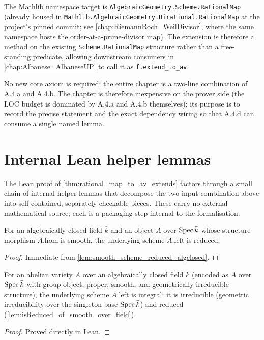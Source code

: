 The Mathlib namespace target is
\texttt{AlgebraicGeometry.Scheme.RationalMap} (already housed in
\texttt{Mathlib.AlgebraicGeometry.Birational.RationalMap} at the project's pinned commit;
see \cref{chap:RiemannRoch_WeilDivisor}, where the same namespace hosts the
order-at-a-prime-divisor map). The extension is therefore a method on the existing
\texttt{Scheme.RationalMap} structure rather than a free-standing predicate, allowing
downstream consumers in \cref{chap:Albanese_AlbaneseUP} to call it as
\texttt{f.extend\_to\_av}.

No new core axiom is required; the entire chapter is a two-line combination of A.4.a and
A.4.b. The chapter is therefore inexpensive on the prover side (the LOC budget is dominated
by A.4.a and A.4.b themselves); its purpose is to record the precise statement and the
exact dependency wiring so that A.4.d can consume a single named lemma.

\section{Internal Lean helper lemmas}
\label{sec:thm32_lean_helpers}

The Lean proof of \cref{thm:rational_map_to_av_extends} factors through a small
chain of internal helper lemmas that decompose the two-input combination above
into self-contained, separately-checkable pieces. These carry no external
mathematical source; each is a packaging step internal to the formalisation.

\begin{lemma}
  \label{lem:isReduced_of_smooth_over_field}
  For an algebraically closed field \(\bar k\) and an object \(A\) over
  \(\operatorname{Spec} \bar k\) whose structure morphism \(A.\mathrm{hom}\) is smooth, the
  underlying scheme \(A.\mathrm{left}\) is reduced.
  \begin{proof}
    Immediate from \cref{lem:smooth_scheme_reduced_algclosed}.
  \end{proof}
\end{lemma}

\begin{lemma}
  \label{lem:av_isIntegral_of_smooth_geomIrred}
  For an abelian variety \(A\) over an algebraically closed field \(\bar k\)
  (encoded as \(A\) over \(\operatorname{Spec} \bar k\) with group-object, proper, smooth, and
  geometrically irreducible structure), the underlying scheme \(A.\mathrm{left}\)
  is integral: it is irreducible (geometric irreducibility over the singleton
  base \(\operatorname{Spec} \bar k\)) and reduced
  (\cref{lem:isReduced_of_smooth_over_field}).
  \begin{proof}
    Proved directly in Lean.
  \end{proof}
\end{lemma}


